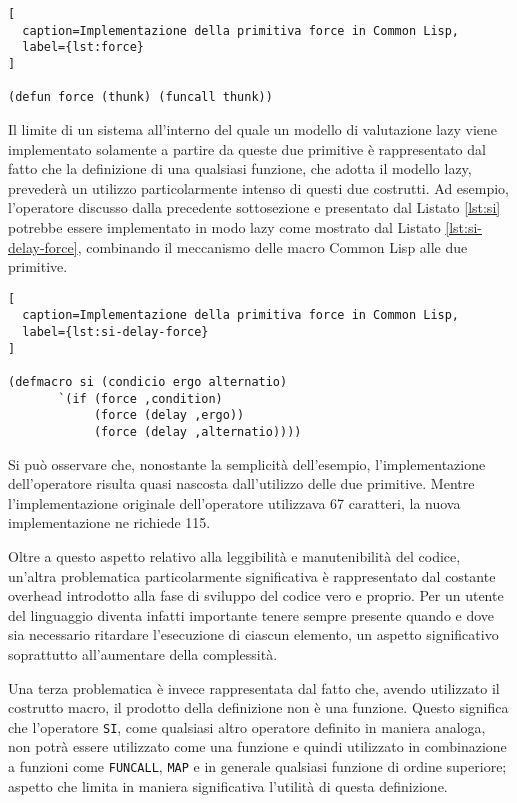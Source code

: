 \begin{lstlisting}[
  caption=Implementazione della primitiva force in Common Lisp,
  label={lst:force}
]

(defun force (thunk) (funcall thunk))

\end{lstlisting}

Il limite di un sistema all'interno del quale un modello di valutazione lazy
viene implementato solamente a partire da queste due primitive è rappresentato
dal fatto che la definizione di una qualsiasi funzione, che adotta il modello
lazy, prevederà un utilizzo particolarmente intenso di questi due costrutti. Ad
esempio, l'operatore discusso dalla precedente sottosezione e presentato dal
Listato \ref{lst:si} potrebbe essere implementato in modo lazy come mostrato dal
Listato \ref{lst:si-delay-force}, combinando il meccanismo delle macro Common
Lisp alle due primitive.

\begin{lstlisting}[
  caption=Implementazione della primitiva force in Common Lisp,
  label={lst:si-delay-force}
]

(defmacro si (condicio ergo alternatio)
       `(if (force ,condition)
            (force (delay ,ergo))
            (force (delay ,alternatio))))

\end{lstlisting}

Si può osservare che, nonostante la semplicità dell'esempio, l'implementazione
dell'operatore risulta quasi nascosta dall'utilizzo delle due primitive. Mentre
l'implementazione originale dell'operatore utilizzava 67 caratteri, la nuova
implementazione ne richiede 115.

Oltre a questo aspetto relativo alla leggibilità e manutenibilità del codice,
un'altra problematica particolarmente significativa è rappresentato dal costante
overhead introdotto alla fase di sviluppo del codice vero e proprio. Per un
utente del linguaggio diventa infatti importante tenere sempre presente quando e
dove sia necessario ritardare l'esecuzione di ciascun elemento, un aspetto
significativo soprattutto all'aumentare della complessità.

Una terza problematica è invece rappresentata dal fatto che, avendo utilizzato
il costrutto macro, il prodotto della definizione non è una funzione. Questo
significa che l'operatore \texttt{SI}, come qualsiasi altro operatore definito
in maniera analoga, non potrà essere utilizzato come una funzione e quindi
utilizzato in combinazione a funzioni come \texttt{FUNCALL}, \texttt{MAP} e in
generale qualsiasi funzione di ordine superiore; aspetto che limita in maniera
significativa l'utilità di questa definizione.

